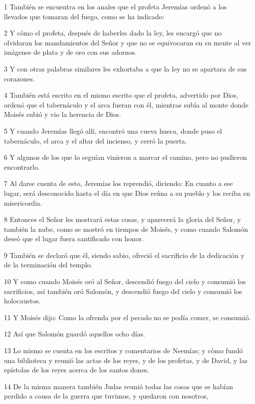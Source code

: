 \par 1 También se encuentra en los anales que el profeta Jeremías ordenó a los llevados que tomaran del fuego, como se ha indicado:
\par 2 Y cómo el profeta, después de haberles dado la ley, les encargó que no olvidaran los mandamientos del Señor y que no se equivocaran en su mente al ver imágenes de plata y de oro con sus adornos.
\par 3 Y con otras palabras similares les exhortaba a que la ley no se apartara de sus corazones.
\par 4 También está escrito en el mismo escrito que el profeta, advertido por Dios, ordenó que el tabernáculo y el arca fueran con él, mientras subía al monte donde Moisés subió y vio la herencia de Dios.
\par 5 Y cuando Jeremías llegó allí, encontró una cueva hueca, donde puso el tabernáculo, el arca y el altar del incienso, y cerró la puerta.
\par 6 Y algunos de los que lo seguían vinieron a marcar el camino, pero no pudieron encontrarlo.
\par 7 Al darse cuenta de esto, Jeremías los reprendió, diciendo: En cuanto a ese lugar, será desconocido hasta el día en que Dios reúna a su pueblo y los reciba en misericordia.
\par 8 Entonces el Señor les mostrará estas cosas, y aparecerá la gloria del Señor, y también la nube, como se mostró en tiempos de Moisés, y como cuando Salomón deseó que el lugar fuera santificado con honor.
\par 9 También se declaró que él, siendo sabio, ofreció el sacrificio de la dedicación y de la terminación del templo.
\par 10 Y como cuando Moisés oró al Señor, descendió fuego del cielo y consumió los sacrificios, así también oró Salomón, y descendió fuego del cielo y consumió los holocaustos.
\par 11 Y Moisés dijo: Como la ofrenda por el pecado no se podía comer, se consumió.
\par 12 Así que Salomón guardó aquellos ocho días.
\par 13 Lo mismo se cuenta en los escritos y comentarios de Neemías; y cómo fundó una biblioteca y reunió las actas de los reyes, y de los profetas, y de David, y las epístolas de los reyes acerca de los santos dones.
\par 14 De la misma manera también Judas reunió todas las cosas que se habían perdido a causa de la guerra que tuvimos, y quedaron con nosotros,
